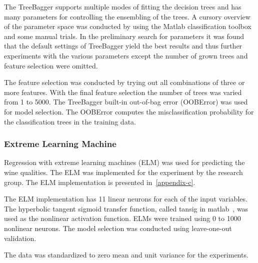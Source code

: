 The TreeBagger supports multiple modes of fitting the decision trees and has many parameters for controlling the ensembling of the trees. A cursory overview of the parameter space was conducted by using the Matlab classification toolbox and some manual trials. In the preliminary search for parameters it was found that the default settings of TreeBagger yield the best results and thus further experiments with the various parameters except the number of grown trees and feature selection were omitted.

The feature selection was conducted by trying out all combinations of three or more features. With the final feature selection the number of trees was varied from 1 to 5000. The TreeBagger built-in out-of-bag error (OOBError) was used for model selection. The OOBError computes the misclassification probability for the classification trees in the training data.

\subsubsection{Extreme Learning Machine}
Regression with extreme learning machines (ELM) was used for predicting the wine qualities. The ELM was implemented for the experiment by the research group. The ELM implementation is presented in~\ref{appendix-c}.

The ELM implementation has 11 linear neurons for each of the input variables. The hyperbolic tangent sigmoid transfer function, called tansig in matlab~\cite{matlab:2015:tansig}, was used as the nonlinear activation function. ELMs were trained using 0 to 1000 nonlinear neurons. The model selection was conducted using leave-one-out validation.

The data was standardized to zero mean and unit variance for the experiments.


